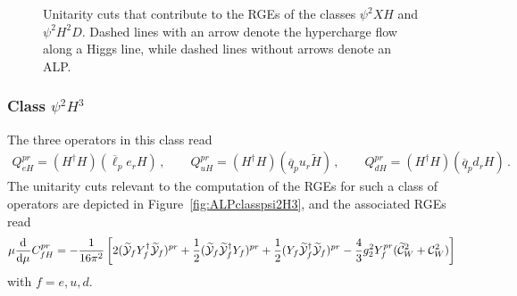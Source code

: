 \begin{figure}[h!tb]
	\,
	\,
\caption[Unitarity cuts for the renormalization of the classes $\psi^2XH$ and $\psi^2H^2D$]{Unitarity cuts that contribute to the RGEs of the classes $\psi^2 XH$ and
$\psi^2 H^2 D$. Dashed lines with an arrow denote the hypercharge flow along a Higgs line,
while dashed lines without arrows denote an ALP.}
\label{fig:ALPclassespsi2}
\end{figure}

\subsubsection{\texorpdfstring{Class $\psi^2 H^3$}{Class psi2 H3}}

The three operators in this class read
\begin{align}
Q_{eH}^{pr} = (H^\dagger H)(\overline{\ell}_p e_r H)\,, \qquad Q_{uH}^{pr} = (H^\dagger H)(\overline{q}_p u_r \widetilde{H})\,, \qquad
Q_{dH}^{pr} = (H^\dagger H)(\overline{q}_p d_r H)\,.
\end{align}
The unitarity cuts relevant to the computation of the RGEs for such a class of operators are
depicted in Figure~\ref{fig:ALPclasspsi2H3}, and the associated RGEs read
\begin{equation}
 \mu \dv[]{}{\mu} {{C}}_{fH}^{pr} =-\frac{1}{16\pi^2}\left[ 2  ( \widetilde{\mathcal{Y}}_f {Y}_f^\dagger \widetilde{\mathcal{Y}}_f)^{pr} + \frac{1}{2} (\widetilde{\mathcal{Y}}_f \widetilde{\mathcal{Y}}_f^\dagger {Y}_f)^{pr} + \frac{1}{2} ({Y}_f \widetilde{\mathcal{Y}}_f^\dagger \widetilde{\mathcal{Y}}_f)^{pr} - \frac{4}{3}g_2^2 Y_f^{pr}
 (\widetilde{\mathcal{C}}_{W}^2 +  \mathcal{C}_{W}^2)\right]
\end{equation}
with $f = e, u, d$.

